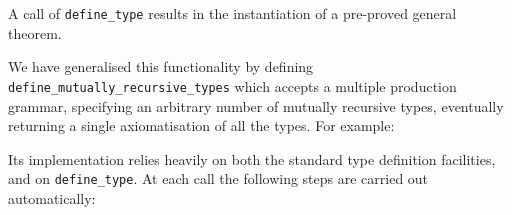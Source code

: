 A call of
{\tt define\_type} results in the instantiation of a pre-proved general
theorem.

We have generalised this functionality by defining 
{\tt define\_mutually\_recursive\_types} which
accepts a multiple production grammar, specifying an arbitrary number of
mutually recursive types, eventually returning a single axiomatisation
of all the types. For example:

\begin{center}
\end{center}

Its implementation relies heavily on both the standard
type definition facilities, and on {\tt define\_type}. At each call
the following steps are carried out automatically:

